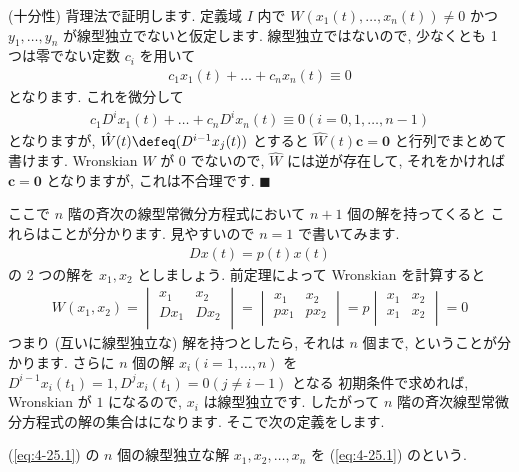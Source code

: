 \documentclass[openany, a4paper, oneside]{jsbook}
\begin{document}
(十分性)
背理法で証明します.
定義域 $I$ 内で $W ( x_1 (t) , \dots ,x_n (t)) \not= 0$ かつ $y_1, \dots , y_n$ が線型独立でないと仮定します.
線型独立ではないので, 少なくとも 1 つは零でない定数 $c_i$ を用いて
\begin{gather}
c_1 x_1 (t) + \dots + c_n x_n (t) \equiv 0
\end{gather}
となります.
これを微分して
\begin{gather}
c_1 D^i x_1 (t) + \dots + c_n D^i x_n (t) \equiv 0
( i = 0, 1, \dots , n-1)
\end{gather}
となりますが,  $\hat{W}(t) \defeq ( D^{i-1} x_j (t) )$ とすると
$\hat{W}(t) \bm{c} = \bm{0}$ と行列でまとめて書けます.
Wronskian $W$ が $0$ でないので,  $\hat{W}$ には逆が存在して, それをかければ $\bm{c} = \bm{0}$ となりますが,
これは不合理です.  $\blacksquare$

ここで $n$ 階の斉次の線型常微分方程式において $n+1$ 個の解を持ってくると
これらはことが分かります.
見やすいので $n=1$ で書いてみます.
\begin{gather}
D x (t) = p (t) x (t)
\end{gather}
の 2 つの解を $x_1 , x_2$ としましょう.
前定理によって Wronskian を計算すると
\begin{gather}
W (x_1,x_2)
=
\begin{vmatrix}
x_1 & x_2 \\
Dx_1 & D x_2 \\
\end{vmatrix}
=
\begin{vmatrix}
x_1 & x_2 \\
p x_1 & p x_2 \\
\end{vmatrix}
=
p
\begin{vmatrix}
x_1 & x_2 \\
x_1 & x_2 \\
\end{vmatrix}
=
0
\end{gather}
つまり (互いに線型独立な) 解を持つとしたら, それは $n$ 個まで, ということが分かります.
さらに $n$ 個の解 $x_i (i=1,\dots,n)$ を $D^{i-1}x_i (t_1)=1 ,D^{j}x_i (t_1)=0 (j\not= i-1)$ となる
初期条件で求めれば, Wronskian が $1$ になるので,  $x_i$ は線型独立です.
したがって $n$ 階の斉次線型常微分方程式の解の集合はになります.
そこで次の定義をします.
\begin{defn}
(\ref{eq:4-25.1}) の $n$ 個の線型独立な解 $x_1, x_2 , \dots , x_n$ を
(\ref{eq:4-25.1}) のという.
\end{defn}
\end{document}
